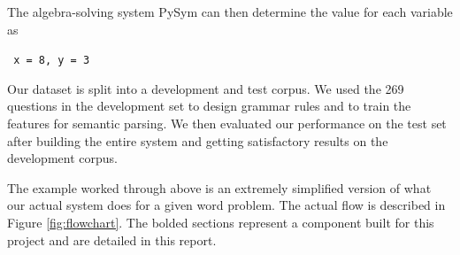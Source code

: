 \documentclass[11pt]{article}
\begin{document}
The algebra-solving system PySym can then determine the value for each variable as

\begin{center}
    \texttt{
x = 8, y = 3
    }
\end{center}

Our dataset is split into a development and test corpus. We used the 269 questions in the development set to design grammar rules and to train the features for semantic parsing. We then evaluated our performance on the test set after building the entire system and getting satisfactory results on the development corpus.

The example worked through above is an extremely simplified version of what our actual system does for a given word problem. The actual flow is described in Figure \ref{fig:flowchart}. The bolded sections represent a component built for this project and are detailed in this report.
\end{document}
